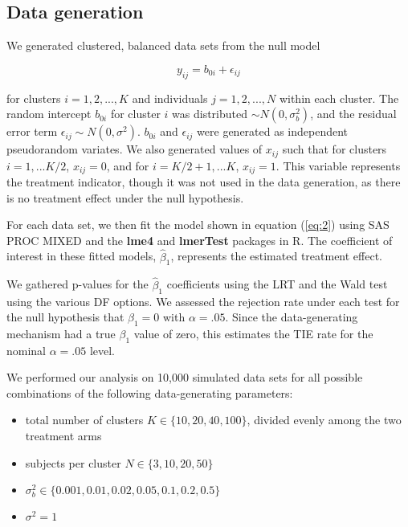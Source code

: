 \documentclass[twocolumn]{bmcart}%
\begin{document}
\subsection*{Data generation}

We generated clustered, balanced data sets from the null model

\begin{equation}
  \label{eq:3}
    y_{ij} = b_{0i} + \epsilon_{ij} 
\end{equation}


for clusters $i = 1, 2, ..., K$ and individuals $j = 1, 2, ..., N$ within each cluster. The random intercept $b_{0i}$ for cluster $i$ was distributed $\sim N(0, \sigma_b^2)$, and the residual error term $\epsilon_{ij} \sim N(0, \sigma^2)$.  $b_{0i}$ and $\epsilon_{ij}$ were generated as independent pseudorandom variates. We also generated values of $x_{ij}$ such that for clusters $i = 1, ... K/2$,  $x_{ij}=0$, and for $i = K/2 +1, ... K$, $x_{ij}=1$.  This variable represents the treatment indicator, though it was not used in the data generation, as there is no treatment effect under the null hypothesis.

For each data set, we then fit the model shown in equation (\ref{eq:2}) using SAS PROC MIXED and the \textbf{lme4} and \textbf{lmerTest} packages in R. The coefficient of interest in these fitted models, $\hat{\beta}_1$, represents the estimated treatment effect.

We gathered p-values for the $\hat{\beta}_1$ coefficients using the LRT and the Wald test using the various DF options.  We assessed the rejection rate under each test for the null hypothesis that $\beta_1=0$ with $\alpha=.05$.  Since the data-generating mechanism had a true $\beta_1$ value of zero, this estimates the TIE rate for the nominal $\alpha = .05$ level.

We performed our analysis on 10,000 simulated data sets for all possible combinations of the following data-generating parameters:
\begin{itemize}
 \item total number of clusters $K\in \{10, 20, 40, 100\}$, divided evenly among the two treatment arms
 
 \item subjects per cluster $N \in \{3, 10, 20, 50\}$
 
 \item $\sigma_b^2 \in \{0.001, 0.01, 0.02, 0.05, 0.1, 0.2, 0.5\}$
 
 \item $\sigma^2 = 1$
\end{itemize}
\end{document}
